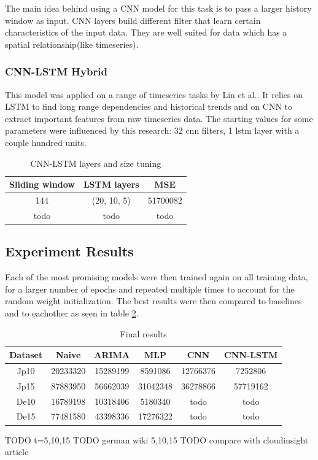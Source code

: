\documentclass[12pt]{article}
\begin{document}
  The main idea behind using a CNN model for this task is to pass a larger history window as input. 
  CNN layers build different filter that learn certain characteristics of the input data. They are well 
  suited for data which has a spatial relationship(like timeseries)\cite{cnn}.

  \subsubsection{CNN-LSTM Hybrid}
  This model was applied on a range of timeseries tasks by Lin et al.\cite{cnn_lstm}.
  It relies on LSTM to find long range dependencies and historical trends and on CNN 
  to extract important features from raw timeseries data. The starting values for 
  some parameters were influenced by this research: 32 cnn filters, 1 lstm layer with 
  a couple hundred units.

  \begin{table}
    \begin{center}
      \caption{CNN-LSTM layers and size tuning}
      \label{tab:layers_cnn_lstm}
      \begin{tabular}{c|c|c}
        \textbf{Sliding window} & \textbf{LSTM layers} & \textbf{MSE}\\
        \hline
        144 & (20, 10, 5) & 51700082\\
        todo & todo & todo\\
      \end{tabular}
    \end{center}
  \end{table}


  \subsection{Experiment Results}

  Each of the most promising models were then trained again on all training data,
  for a larger number of epochs and repeated multiple times to account for the 
  random weight initialization. The best results were then compared to baselines
  and to eachother as seen in table \ref{tab:final_eval}.

  \begin{table}[h]
    \begin{center}
      \caption{Final results}
      \label{tab:final_eval}
      \begin{tabular}{c|c|c|c|c|c}
        \textbf{Dataset} & \textbf{Naive} & \textbf{ARIMA} & \textbf{MLP} & \textbf{CNN} & \textbf{CNN-LSTM} \\
        \hline
        Jp10 & 20233320 & 15289199 & 8591086 & 12766376 & 7252806 \\
        Jp15 & 87883950 & 56662039 & 31042348 & 36278866 & 57719162 \\
        De10 & 16789198 & 10318406 & 5180340 & todo & todo \\
        De15 & 77481580 & 43398336 & 17276322 & todo & todo \\
      \end{tabular}
    \end{center}
  \end{table}

  TODO t=5,10,15
  TODO german wiki 5,10,15
  TODO compare with cloudinsight article

  \newpage
  {}
  
\end{document}
